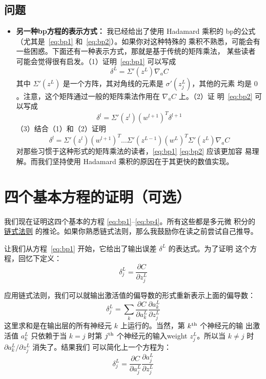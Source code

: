 \subsection*{问题}

\begin{itemize}
\item \textbf{另一种\gls*{bp}方程的表示方式：} 我已经给出了使用 Hadamard 乘积的
  \gls*{bp}的公式（尤其是~\eqref{eq:bp1} 和~\eqref{eq:bp2}）。如果你对这种特殊的
  乘积不熟悉，可能会有一些困惑。下面还有一种表示方式，那就是基于传统的矩阵乘法，
  某些读者可能会觉得很有启发。（1）证明~\eqref{eq:bp1} 可以写成
  \begin{equation}
    \delta^L = \Sigma'(z^L) \nabla_a C
    \label{eq:33}\tag{33}
  \end{equation}
  其中 $\Sigma'(z^L)$ 是一个方阵，其对角线的元素是 $\sigma'(z_j^L)$，其他的元素
  均是 $0$。注意，这个矩阵通过一般的矩阵乘法作用在 $\nabla_a C$ 上。（2）证
  明~\eqref{eq:bp2} 可以写成
  \begin{equation}
    \delta^l = \Sigma'(z^l) (w^{l+1})^T \delta^{l+1}
    \label{eq:34}\tag{34}
  \end{equation}
  （3）结合（1）和（2）证明
  \begin{equation}
    \delta^l = \Sigma'(z^l) (w^{l+1})^T \ldots \Sigma'(z^{L-1}) (w^L)^T
    \Sigma'(z^L) \nabla_a C
    \label{eq:35}\tag{35}
  \end{equation}
  对那些习惯于这种形式的矩阵乘法的读者，\eqref{eq:bp1} \eqref{eq:bp2} 应该更加容
  易理解。而我们坚持使用 Hadamard 乘积的原因在于其更快的数值实现。
\end{itemize}

\section{四个基本方程的证明（可选）}
\label{sec:proof_of_the_four_fundamental_equations}

我们现在证明这四个基本的方程 \eqref{eq:bp1}--\eqref{eq:bp4}。所有这些都是多元微
积分的\href{https://en.wikipedia.org/wiki/Chain_rule}{链式法则}%
的推论。如果你熟悉链式法则，那么我鼓励你在读之前尝试自己推导。

让我们从方程~\eqref{eq:bp1} 开始，它给出了输出误差 $\delta^L$ 的表达式。为了证明
这个方程，回忆下定义：
\begin{equation}
  \delta^L_j = \frac{\partial C}{\partial z^L_j}
\label{eq:36}\tag{36}
\end{equation}

应用链式法则，我们可以就输出激活值的偏导数的形式重新表示上面的偏导数：
\begin{equation}
  \delta^L_j = \sum_k \frac{\partial C}{\partial a^L_k} \frac{\partial a^L_k}{\partial z^L_j}
\label{eq:37}\tag{37}
\end{equation}
这里求和是在输出层的所有神经元 $k$ 上运行的。当然，第 $k^{\rm th}$ 个神经元的输
出激活值 $a^L_k$ 只依赖于当 $k=j$ 时第 $j^{\rm th}$ 个神经元的输入\gls*{weight}
$z^L_j$。所以当 $k \neq j$ 时 $\partial a^L_k / \partial z^L_j$ 消失了。结果我们
可以简化上一个方程为：
\begin{equation}
  \delta^L_j = \frac{\partial C}{\partial a^L_j} \frac{\partial a^L_j}{\partial z^L_j}
\label{eq:38}\tag{38}
\end{equation}

